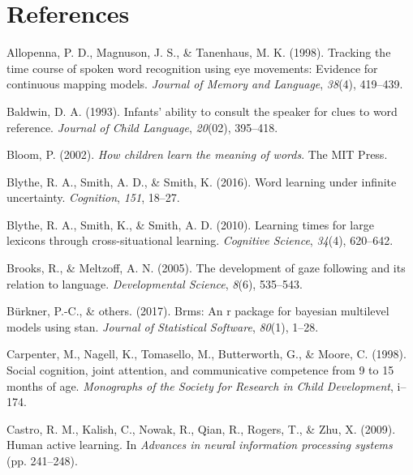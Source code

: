 \documentclass[man,floatsintext]{apa6}
\begin{document}
\newpage

\section{References}\label{references}

\begingroup
\setlength{\parindent}{-0.5in} \setlength{\leftskip}{0.5in}

\hypertarget{refs}{}
\hypertarget{ref-allopenna1998tracking}{}
Allopenna, P. D., Magnuson, J. S., \& Tanenhaus, M. K. (1998). Tracking
the time course of spoken word recognition using eye movements: Evidence
for continuous mapping models. \emph{Journal of Memory and Language},
\emph{38}(4), 419--439.

\hypertarget{ref-baldwin1993infants}{}
Baldwin, D. A. (1993). Infants' ability to consult the speaker for clues
to word reference. \emph{Journal of Child Language}, \emph{20}(02),
395--418.

\hypertarget{ref-bloom2002children}{}
Bloom, P. (2002). \emph{How children learn the meaning of words}. The
MIT Press.

\hypertarget{ref-blythe2016word}{}
Blythe, R. A., Smith, A. D., \& Smith, K. (2016). Word learning under
infinite uncertainty. \emph{Cognition}, \emph{151}, 18--27.

\hypertarget{ref-blythe2010learning}{}
Blythe, R. A., Smith, K., \& Smith, A. D. (2010). Learning times for
large lexicons through cross-situational learning. \emph{Cognitive
Science}, \emph{34}(4), 620--642.

\hypertarget{ref-brooks2005development}{}
Brooks, R., \& Meltzoff, A. N. (2005). The development of gaze following
and its relation to language. \emph{Developmental Science}, \emph{8}(6),
535--543.

\hypertarget{ref-burkner2017brms}{}
Bürkner, P.-C., \& others. (2017). Brms: An r package for bayesian
multilevel models using stan. \emph{Journal of Statistical Software},
\emph{80}(1), 1--28.

\hypertarget{ref-carpenter1998social}{}
Carpenter, M., Nagell, K., Tomasello, M., Butterworth, G., \& Moore, C.
(1998). Social cognition, joint attention, and communicative competence
from 9 to 15 months of age. \emph{Monographs of the Society for Research
in Child Development}, i--174.

\hypertarget{ref-castro2009human}{}
Castro, R. M., Kalish, C., Nowak, R., Qian, R., Rogers, T., \& Zhu, X.
(2009). Human active learning. In \emph{Advances in neural information
processing systems} (pp. 241--248).
\end{document}
